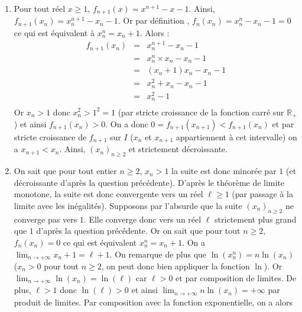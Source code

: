\documentclass[a4paper,twoside,french,10pt]{VcCours}
\begin{document}
\begin{enumerate}
\begin{center}
\end{center}
La fonction $f_n$ est continue et strictement croissante sur $I$, on a : 
$$\lim_{x \rightarrow 1} f_n(x)=-1, \; \lim_{ x \rightarrow + \infty} f_n(x)= + \infty$$
 et $0 \in ]-1, + \infty [$. D'après le théorème de bijection, il existe un unique réel $x_n \in ]1, + \infty[$ tel que $f_n(x_n)=0.$
\item Pour tout réel $x \geq 1$, $f_{n+1}(x) = x^{n+1}-x-1$. Ainsi, $f_{n+1}(x_n)= x_n^{n+1}-x_n-1$. Or par définition , $f_n(x_n) = x_n^{n}-x_n-1 = 0$ ce qui est équivalent à $x_n^n = x_n+1$. Alors :
\[ \begin{array}{ccl}
f_{n+1}(x_n) & = & x_n^{n+1}-x_n-1 \\
& = & x_n^n \times x_n - x_n - 1 \\
& = & (x_n+1) x_n -x_n -1 \\
& = & x_n^2 +x_n -x_n -1  \\
& = & x_n^2 - 1 \\
\end{array} \]
Or $x_n>1$ donc $x_n^2 > 1^2=1$ (par stricte croissance de la fonction carré sur $\mathbb{R}_+$) et ainsi $f_{n+1}(x_n)>0$.  On a donc $0=f_{n+1}(x_{n+1}) < f_{n+1}(x_n)$ et par stricte croissance de $f_{n+1}$ sur $I$ ($x_n$ et $x_{n+1}$ appartiennent à cet intervalle) on a $x_{n+1} < x_n$. Ainsi, $(x_n)_{n \geq 2}$ et strictement décroissante.
\item On sait que pour tout entier $n \geq 2$, $x_n >1$ la suite est donc minorée par $1$ (et décroissante d'après la question précédente). D'après le théorème de limite monotone, la suite est donc convergente vers un réel $\ell \geq 1$ (par passage à la limite avec les inégalités). 
\noindent Supposons par l'absurde que la suite $(x_n)_{n \geq 2}$ ne converge pas vers $1$. Elle converge donc vers un réel $\ell$ strictement plus grand que $1$ d'après la question précédente. Or on sait que pour tout $n \geq 2$, $f_n(x_n)=0$ ce qui est équivalent $x_n^n = x_n + 1$. On a $\lim_{n \rightarrow + \infty} x_n + 1 = \ell + 1$. On remarque de plus que $\ln(x_n^n) = n \ln(x_n)$ ($x_n>0$ pour tout $n \geq 2$, on peut donc bien appliquer la fonction $\ln$). Or $\lim_{n \rightarrow + \infty} \ln(x_n) = \ln(\ell)$ car $\ell >0$ et par composition de limites. De plus, $\ell>1$ donc $\ln(\ell) >0$ et ainsi $\lim_{n \rightarrow + \infty} n \ln(x_n) = + \infty$ par produit de limites. Par composition avec la fonction exponentielle, on a alors 

\end{enumerate}
\end{document}
